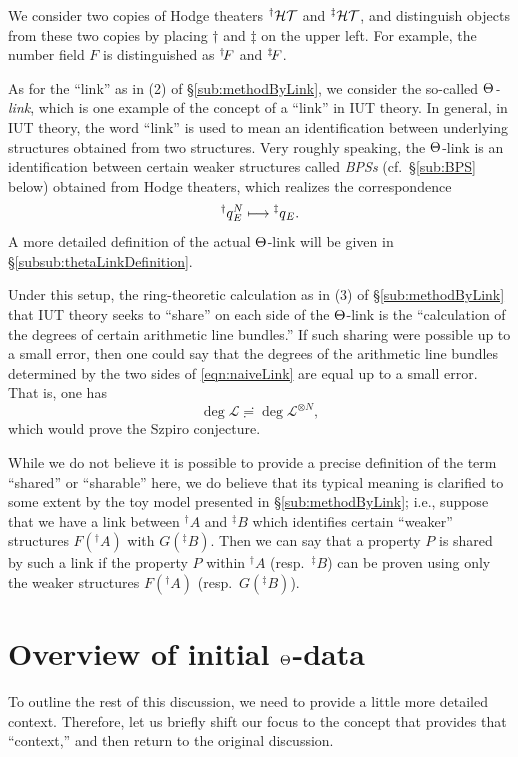 \documentclass[12pt, reqno, a4paper]{amsart}
\def\cL{{\mathcal{L}}}
\begin{document}
\medskip\noindent
We consider two copies of Hodge theaters $\HT[\dag]$ and $\HT[\ddag]$, and distinguish objects from these two copies by placing $\dag$ and $\ddag$ on the upper left.
For example, the number field $F$ is distinguished as $\FF[\dag]$ and $\FF[\ddag]$.


As for the ``link'' as in (2) of \S\ref{sub:methodByLink}, we consider the so-called {\it $\Th$-link}, which is one example of the concept of a ``link'' in IUT theory.
In general, in IUT theory, the word ``link'' is used to mean an identification between underlying structures obtained from two structures.
Very roughly speaking, the $\Th$-link is an identification between certain weaker structures called {\it BPSs} (cf.\ \S\ref{sub:BPS} below) obtained from Hodge theaters, which realizes the correspondence
\begin{equation}\label{eqn:naiveLink}
\qq[\dag]^N_E\longmapsto\qq[\ddag]_E.
\end{equation}
A more detailed definition of the actual $\Th$-link will be given in \S\ref{subsub:thetaLinkDefinition}.


Under this setup, the ring-theoretic calculation as in (3) of \S\ref{sub:methodByLink} that IUT theory seeks to ``share'' on each side of the $\Th$-link is the ``calculation of the degrees of certain arithmetic line bundles.''
If such sharing were possible up to a small error, then one could say that the degrees of the arithmetic line bundles determined by the two sides of \eqref{eqn:naiveLink} are equal up to a small error.
That is, one has
$$
\deg \cL\risingdotseq\deg \cL^{\otimes N}, 
$$
which would prove the Szpiro conjecture.


\begin{rem}\label{rem:sharable}
While we do not believe it is possible to provide a precise definition of the term ``shared'' or ``sharable'' here, we do believe that its typical meaning is clarified to some extent by the toy model presented in \S\ref{sub:methodByLink}; i.e., suppose that we have a link between ${}^{\dag}\!A$ and ${}^{\ddag}\!B$ which identifies certain ``weaker'' structures $F({}^{\dag}\!A)$ with $G({}^{\ddag}\!B)$.  Then we can say that a property $P$ is shared by such a link if the property $P$ within ${}^{\dag}\!A$ (resp.\ ${}^{\ddag}\!B$) can be proven using only the weaker structures $F({}^{\dag}\!A)$ (resp.\ $G({}^{\ddag}\!B)$).
\end{rem}




\setcounter{equation}{0}
\section{Overview of initial \(\Th\)-data}
To outline the rest of this discussion, we need to provide a little more detailed context. 
Therefore, let us briefly shift our focus to the concept that provides that ``context,'' and then return to the original discussion.
\end{document}
